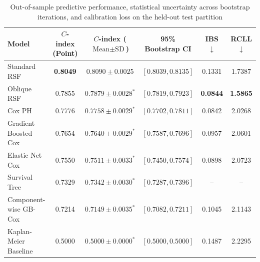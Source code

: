 \documentclass[pdflatex,iicol,sn-mathphys-ay]{sn-jnl}
\theoremstyle{thmstyleone}%
\theoremstyle{thmstyletwo}%
\theoremstyle{thmstylethree}%
\begin{document}
\begin{table}[htbp]
\centering
\small
\caption{Out-of-sample predictive performance, statistical uncertainty across bootstrap iterations, and calibration loss on the held-out test partition}\label{tab:performance_comparison}
\begin{tabular*}{\textwidth}{@{\extracolsep{\fill}} lccccc}
\toprule
Model & $C$-index (Point) & $C$-index ($\text{Mean} \pm \text{SD}$) & 95\% Bootstrap CI & IBS $\downarrow$ & RCLL $\downarrow$ \\
\midrule
Standard RSF \citep{ishwaran2008random} & \textbf{0.8049} & $0.8090 \pm 0.0025$ & $[0.8039, 0.8135]$ & 0.1331 & 1.7387 \\
Oblique RSF \citep{jaeger2023oblique} & 0.7855 & $0.7879 \pm 0.0028^*$ & $[0.7819, 0.7923]$ & \textbf{0.0844} & \textbf{1.5865} \\
Cox PH \citep{cox1972regression} & 0.7776 & $0.7758 \pm 0.0029^*$ & $[0.7702, 0.7811]$ & 0.0842 & 2.0268 \\
Gradient Boosted Cox \citep{hothorn2006survival} & 0.7654 & $0.7640 \pm 0.0029^*$ & $[0.7587, 0.7696]$ & 0.0957 & 2.0601 \\
Elastic Net Cox \citep{simon2011regularization} & 0.7550 & $0.7511 \pm 0.0033^*$ & $[0.7450, 0.7574]$ & 0.0898 & 2.0723 \\
Survival Tree \citep{bou2011review} & 0.7329 & $0.7342 \pm 0.0030^*$ & $[0.7287, 0.7396]$ & -- & -- \\
Component-wise GB-Cox \citep{buhlmann2003boosting} & 0.7214 & $0.7149 \pm 0.0035^*$ & $[0.7082, 0.7211]$ & 0.1045 & 2.1143 \\
Kaplan-Meier Baseline \citep{kaplan1958nonparametric} & 0.5000 & $0.5000 \pm 0.0000^*$ & $[0.5000, 0.5000]$ & 0.1487 & 2.2295 \\
\bottomrule
\end{tabular*}
\end{table}
\end{document}
